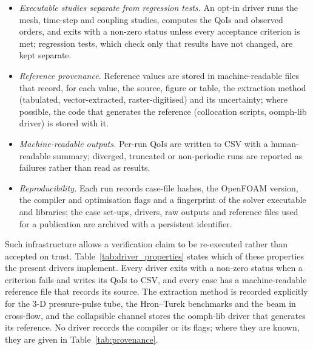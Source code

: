 \begin{itemize}
	\item \emph{Executable studies separate from regression tests.} An opt-in driver runs the mesh, time-step and coupling studies, computes the QoIs and observed orders, and exits with a non-zero status unless every acceptance criterion is met; regression tests, which check only that results have not changed, are kept separate.
	\item \emph{Reference provenance.} Reference values are stored in machine-readable files that record, for each value, the source, figure or table, the extraction method (tabulated, vector-extracted, raster-digitised) and its uncertainty; where possible, the code that generates the reference (collocation scripts, oomph-lib driver) is stored with it.
	\item \emph{Machine-readable outputs.} Per-run QoIs are written to CSV with a human-readable summary; diverged, truncated or non-periodic runs are reported as failures rather than read as results.
	\item \emph{Reproducibility.} Each run records case-file hashes, the OpenFOAM version, the compiler and optimisation flags and a fingerprint of the solver executable and libraries; the case set-ups, drivers, raw outputs and reference files used for a publication are archived with a persistent identifier.
\end{itemize}

Such infrastructure allows a verification claim to be re-executed rather than accepted on trust.
Table~\ref{tab:driver_properties} states which of these properties the present drivers implement. Every driver exits with a non-zero status when a criterion fails and writes its QoIs to CSV, and every case has a machine-readable reference file that records its source. The extraction method is recorded explicitly for the 3-D pressure-pulse tube, the Hron--Turek benchmarks and the beam in cross-flow, and the collapsible channel stores the oomph-lib driver that generates its reference. No driver records the compiler or its flags; where they are known, they are given in Table~\ref{tab:provenance}.

